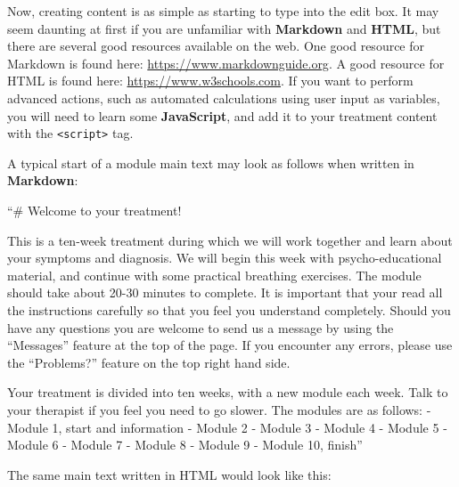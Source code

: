 \documentclass[]{book}
\newenvironment{Shaded}{\begin{snugshade}}{\end{snugshade}}
\newcommand{\FloatTok}[1]{\textcolor[rgb]{0.00,0.00,0.81}{#1}}
\newcommand{\NormalTok}[1]{#1}
\begin{document}
Now, creating content is as simple as starting to type into the edit box. It may seem daunting at first if you are unfamiliar with \textbf{Markdown} and \textbf{HTML}, but there are several good resources available on the web.
One good resource for Markdown is found here: \url{https://www.markdownguide.org}.
A good resource for HTML is found here: \url{https://www.w3schools.com}.
If you want to perform advanced actions, such as automated calculations using user input as variables, you will need to learn some \textbf{JavaScript}, and add it to your treatment content with the \texttt{\textless{}script\textgreater{}} tag.

A typical start of a module main text may look as follows when written in \textbf{Markdown}:

\begin{Shaded}
\begin{Highlighting}[]
\NormalTok{“# Welcome to your treatment!}

\NormalTok{This is a ten-week treatment during which we will work together and learn about your symptoms and diagnosis. We will begin this week with psycho-educational material, and continue with some practical breathing exercises. The module should take about 20-30 minutes to complete. It is important that your read all the instructions carefully so that you feel you understand completely. Should you have any questions you are welcome to send us a message by using the “Messages” feature at the top of the page.}
\NormalTok{If you encounter any errors, please use the “Problems?” feature on the top right hand side.}

\NormalTok{Your treatment is divided into ten weeks, with a new module each week. Talk to your therapist if you feel you need to go slower. The modules are as follows:}
\NormalTok{- }\FloatTok{Module 1, start and information}
\FloatTok{- Module 2}
\FloatTok{- Module 3}
\FloatTok{- Module 4}
\FloatTok{- Module 5}
\FloatTok{- Module 6}
\FloatTok{- Module 7}
\FloatTok{- Module 8}
\FloatTok{- Module 9}
\FloatTok{- Module 10, finish”}
\end{Highlighting}
\end{Shaded}

The same main text written in HTML would look like this:
\end{document}
